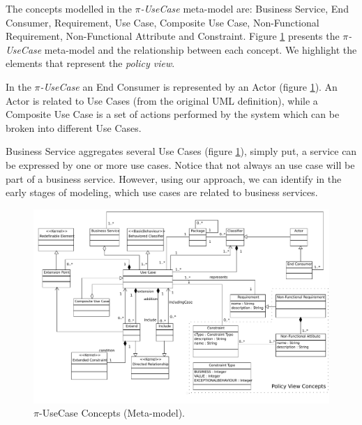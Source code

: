  
The concepts modelled in the \textit{$\pi$-UseCase} meta-model are: {\sc
Business Service, End Consumer, Requirement, Use Case, Composite Use Case, Non-Functional Requirement,
Non-Functional Attribute} and {\sc Constraint}.  Figure
\ref{fig:usecasemodel} presents the \textit{$\pi$-UseCase} meta-model and the
relationship between each concept. We highlight the elements that represent the
\textit{policy view}. 
 
 

In the \textit{$\pi$-UseCase} an {\sc End Consumer} is represented by an {\sc
Actor} (figure \ref{fig:usecasemodel}). An {\sc Actor} is related to {\sc Use Cases}
(from the original UML definition), while a {\sc Composite Use Case} is a set of
actions performed by the system which can be broken into different {\sc Use Cases}.


{\sc Business Service} aggregates several {\sc Use Cases} (figure
\ref{fig:usecasemodel}), simply put, a service can be expressed by one or more
use cases. Notice that not always an use case will be part of a business
service. However, using our approach, we can identify in the early stages of
modeling, which use cases are related to business services.


\begin{figure}[ht!]
\centering
\includegraphics[width=1.0\textwidth]{chapters/methodology/figs/PiUseCaseMetamodel.pdf}
\caption{$\pi$-UseCase Concepts (Meta-model).}
\label{fig:usecasemodel}
\end{figure}


